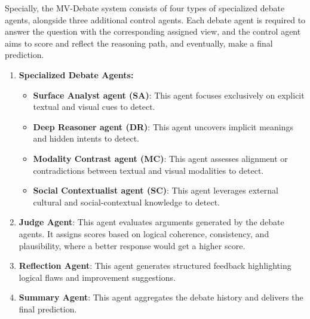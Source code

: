 \documentclass[letterpaper]{article} %
\begin{document}
Specially, the MV-Debate system consists of four types of specialized debate agents, alongside three additional control agents. Each debate agent is required to answer the question with the corresponding assigned view, and the control agent aims to score and reflect the reasoning path, and eventually, make a final prediction.

\begin{enumerate}
    \item \textbf{Specialized Debate Agents:}
    \begin{itemize}
        \item \textbf{Surface Analyst agent (SA)}: This agent focuses exclusively on explicit textual and visual cues to detect.
        \item \textbf{Deep Reasoner agent (DR)}: This agent uncovers implicit meanings and hidden intents to detect.
        \item \textbf{Modality Contrast agent (MC)}: This agent assesses alignment or contradictions between textual and visual modalities to detect.
        \item \textbf{Social Contextualist agent (SC)}: This agent leverages external cultural and social-contextual knowledge to detect.
    \end{itemize}
    
    \item \textbf{Judge Agent}: This agent evaluates arguments generated by the debate agents. It assigns scores based on logical coherence, consistency, and plausibility, where a better response would get a higher score.
    
    \item \textbf{Reflection Agent}: This agent generates structured feedback highlighting logical flaws and improvement suggestions.
    
    \item \textbf{Summary Agent}: This agent aggregates the debate history and delivers the final prediction.
\end{enumerate}
\end{document}
